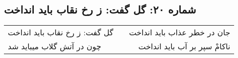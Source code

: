 \begin{center}
\section*{شماره ۲۰: گل گفت: ز رخ نقاب باید انداخت}
\label{sec:020}
\begin{longtable}{l p{0.5cm} r}
گل گفت: ز رخ نقاب باید انداخت
&&
جان در خطر عذاب باید انداخت
\\
چون در آتش گلاب میباید شد
&&
ناکامْ سپر بر آب باید انداخت
\\
\end{longtable}
\end{center}
